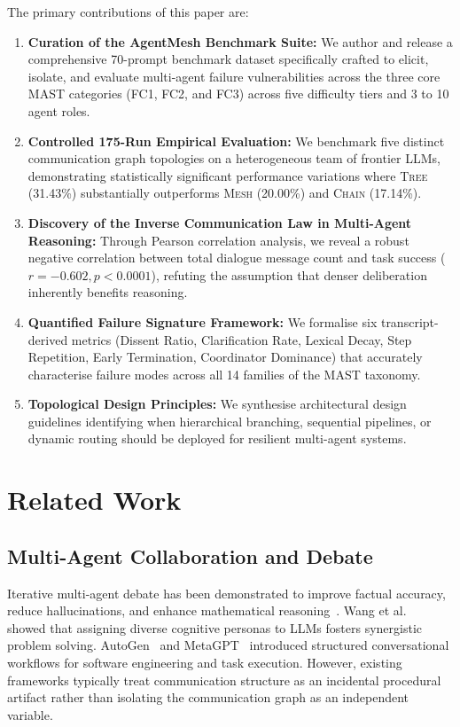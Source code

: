 \documentclass[conference]{IEEEtran}
\newcommand{\topo}[1]{\textsc{#1}}  %
\newcommand{\fc}[1]{\textsf{FC#1}}  %
\begin{document}
The primary contributions of this paper are:
\begin{enumerate}
  \item \textbf{Curation of the AgentMesh Benchmark Suite:} We author and release a comprehensive 70-prompt benchmark dataset specifically crafted to elicit, isolate, and evaluate multi-agent failure vulnerabilities across the three core MAST categories (\fc{1}, \fc{2}, and \fc{3}) across five difficulty tiers and 3 to 10 agent roles.
  \item \textbf{Controlled 175-Run Empirical Evaluation:} We benchmark five distinct communication graph topologies on a heterogeneous team of frontier LLMs, demonstrating statistically significant performance variations where \topo{Tree} (31.43\%) substantially outperforms \topo{Mesh} (20.00\%) and \topo{Chain} (17.14\%).
  \item \textbf{Discovery of the Inverse Communication Law in Multi-Agent Reasoning:} Through Pearson correlation analysis, we reveal a robust negative correlation between total dialogue message count and task success ($r = -0.602, p < 0.0001$), refuting the assumption that denser deliberation inherently benefits reasoning.
  \item \textbf{Quantified Failure Signature Framework:} We formalise six transcript-derived metrics (Dissent Ratio, Clarification Rate, Lexical Decay, Step Repetition, Early Termination, Coordinator Dominance) that accurately characterise failure modes across all 14 families of the MAST taxonomy.
  \item \textbf{Topological Design Principles:} We synthesise architectural design guidelines identifying when hierarchical branching, sequential pipelines, or dynamic routing should be deployed for resilient multi-agent systems.
\end{enumerate}

\section{Related Work}
\label{sec:related}

\subsection{Multi-Agent Collaboration and Debate}
Iterative multi-agent debate has been demonstrated to improve factual accuracy, reduce hallucinations, and enhance mathematical reasoning~\cite{liang2023encouraging,du2023improving}. Wang et al.~\cite{wang2023unleashing} showed that assigning diverse cognitive personas to LLMs fosters synergistic problem solving. AutoGen~\cite{wu2023autogen} and MetaGPT~\cite{hong2023metagpt} introduced structured conversational workflows for software engineering and task execution. However, existing frameworks typically treat communication structure as an incidental procedural artifact rather than isolating the communication graph as an independent variable.
\end{document}
